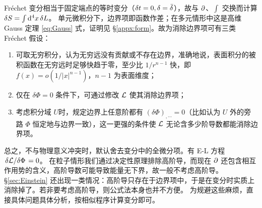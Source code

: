 Fréchet 变分相当于固定端点的等时变分（$\delta t=0,\var=\bar\var$），故与 $\partial$、$\int$ 交换而计算 $\var S=\int \dd[4]{x}\var L$。
单元微积分下，边界项即函数作差；在多元情形中这是高维 Gauss 定理 \eqref{eq:Gauss} 式，证明见 \S\ref{appx:form}。故为消除边界项可有三类 Fréchet 假设：
\begin{enumerate}
    \item 可取无穷积分，认为无穷远没有贡献或不存在边界，准确地说，表面积分的被积函数在无穷远时足够快趋于零，至少比 $1/r^{n-1}$ 快，即 $f(x)=o(1/|x|^{n-1})$，$n-1$ 为表面维度；
    \item 仅在 $\delta \Phi=0$ 条件下，可通过修改 $\mathcal{L}$ 使其消除边界项；
    \item 考虑积分域 $U$时，规定边界上任意阶都有 $(\delta \Phi)_{,\cdots}=0$（比如认为 $U$ 外的旁路 $\Phi$ 恒定地与边界一致），这一更强的条件使 $\mathcal{L}$ 无论含多少阶导数都能消除边界项。
\end{enumerate}
总之，不与物理意义冲突时，默认舍去变分中的全微分项。有 E-L 方程 $\fdv*{\Lag}{\Phi}=0$。
在粒子情形我们通过决定性原理排除高阶导，而现在 $\partial$ 还包含相互作用势的含义，高阶导数可能导致能量无下界，故一般不考虑高阶导。\S\ref{sec:Einstein} 还出现一类情况：高阶导只存在于边界项中，于是在变分时实质上消除掉了。若非要考虑高阶导，则公式法本身也并不方便。
为规避这些麻烦，直接具体问题具体分析，按相似程序计算变分即可。

